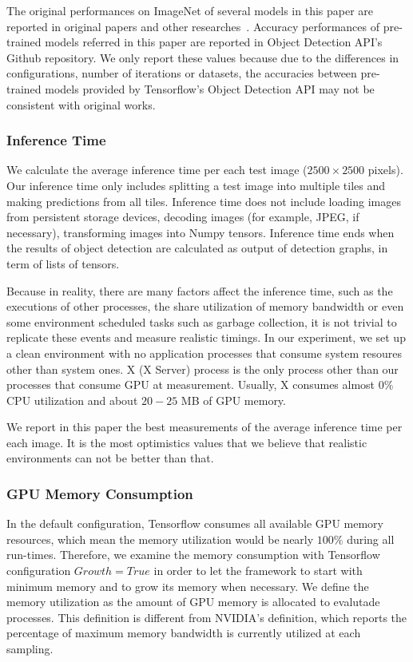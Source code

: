 \documentclass[conference]{IEEEtran}
\begin{document}
The original performances on ImageNet of several models in this paper are reported in original papers and other researches~\cite{huang2017speed}. Accuracy performances of pre-trained models referred in this paper are reported in Object Detection API's Github repository. We only report these values because due to the differences in configurations, number of iterations or datasets, the accuracies between pre-trained models provided by Tensorflow's Object Detection API may not be consistent with original works.

\subsubsection{Inference Time}
We calculate the average inference time per each test image ($2500 \times 2500$ pixels). Our inference time only includes splitting a test image into multiple tiles and making predictions from all tiles. Inference time does not include loading images from persistent storage devices, decoding images (for example, JPEG, if necessary), transforming images into Numpy tensors. Inference time ends when the results of object detection are calculated as output of detection graphs, in term of lists of tensors.

Because in reality, there are many factors affect the inference time, such as the executions of other processes, the share utilization of memory bandwidth or even some environment scheduled tasks such as garbage collection, it is not trivial to replicate these events and measure realistic timings. In our experiment, we set up a clean environment with no application processes that consume system resoures other than system ones. X (X Server) process is the only process other than our processes that consume GPU at measurement. Usually, X consumes almost $0\%$ CPU utilization and about $ 20 - 25 $ MB of GPU memory.


We report in this paper the best measurements of the average inference time per each image. It is the most optimistics values that we believe that realistic environments can not be better than that.

\subsubsection{GPU Memory Consumption}
In the default configuration, Tensorflow consumes all available GPU memory resources, which mean the memory utilization would be nearly $100\%$ during all run-times. Therefore, we examine the memory consumption with Tensorflow configuration $Growth = True$ in order to let the framework to start with minimum memory and to grow its memory when necessary. We define the memory utilization as the amount of GPU memory is allocated to evalutade processes. This definition is different from NVIDIA's definition, which reports the percentage of maximum memory bandwidth is currently utilized at each sampling.
\end{document}

